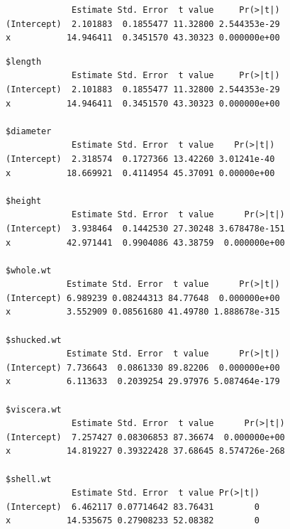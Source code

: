\documentclass[
  11pt,
]{krantz}
\newenvironment{Shaded}{\begin{snugshade}}{\end{snugshade}}
\newcommand{\CommentTok}[1]{\textcolor[rgb]{0.37,0.37,0.37}{\textit{#1}}}
\newcommand{\ControlFlowTok}[1]{\textcolor[rgb]{0.27,0.27,0.27}{\textbf{#1}}}
\newcommand{\DecValTok}[1]{\textcolor[rgb]{0.06,0.06,0.06}{#1}}
\newcommand{\FunctionTok}[1]{\textcolor[rgb]{0,0,0}{#1}}
\newcommand{\NormalTok}[1]{#1}
\newcommand{\OtherTok}[1]{\textcolor[rgb]{0.37,0.37,0.37}{#1}}
\newcommand{\SpecialCharTok}[1]{\textcolor[rgb]{0,0,0}{#1}}
\begin{document}
\begin{Shaded}
\end{Shaded}

\begin{verbatim}
             Estimate Std. Error  t value     Pr(>|t|)
(Intercept)  2.101883  0.1855477 11.32800 2.544353e-29
x           14.946411  0.3451570 43.30323 0.000000e+00
\end{verbatim}

\begin{Shaded}
\end{Shaded}

\begin{verbatim}
$length
             Estimate Std. Error  t value     Pr(>|t|)
(Intercept)  2.101883  0.1855477 11.32800 2.544353e-29
x           14.946411  0.3451570 43.30323 0.000000e+00

$diameter
             Estimate Std. Error  t value    Pr(>|t|)
(Intercept)  2.318574  0.1727366 13.42260 3.01241e-40
x           18.669921  0.4114954 45.37091 0.00000e+00

$height
             Estimate Std. Error  t value      Pr(>|t|)
(Intercept)  3.938464  0.1442530 27.30248 3.678478e-151
x           42.971441  0.9904086 43.38759  0.000000e+00

$whole.wt
            Estimate Std. Error  t value      Pr(>|t|)
(Intercept) 6.989239 0.08244313 84.77648  0.000000e+00
x           3.552909 0.08561680 41.49780 1.888678e-315

$shucked.wt
            Estimate Std. Error  t value      Pr(>|t|)
(Intercept) 7.736643  0.0861330 89.82206  0.000000e+00
x           6.113633  0.2039254 29.97976 5.087464e-179

$viscera.wt
             Estimate Std. Error  t value      Pr(>|t|)
(Intercept)  7.257427 0.08306853 87.36674  0.000000e+00
x           14.819227 0.39322428 37.68645 8.574726e-268

$shell.wt
             Estimate Std. Error  t value Pr(>|t|)
(Intercept)  6.462117 0.07714642 83.76431        0
x           14.535675 0.27908233 52.08382        0
\end{verbatim}
\end{document}
